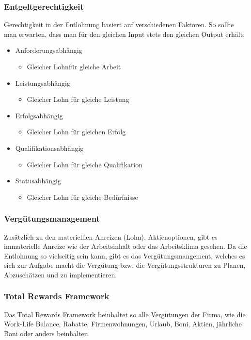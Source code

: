 \documentclass{article}
\begin{document}
	\subsubsection{Entgeltgerechtigkeit}
	Gerechtigkeit in der Entlohnung basiert auf verschiedenen Faktoren. So sollte man erwarten, dass man für den gleichen Input stets den gleichen Output erhält:
	\begin{itemize}
		\item{Anforderungsabhängig}
		\begin{itemize}
			\item{Gleicher Lohnfür gleiche Arbeit}
		\end{itemize}
		\item{Leistungsabhängig}
		\begin{itemize}
			\item{Gleicher Lohn für gleiche Leistung}
		\end{itemize}
		\item{Erfolgsabhängig}
		\begin{itemize}
			\item{Gleicher Lohn für gleichen Erfolg}
		\end{itemize}
		\item{Qualifikationsabhängig}
		\begin{itemize}
			\item{Gleicher Lohn für gleiche Qualifikation}
		\end{itemize}
		\item{Statusabhängig}
		\begin{itemize}
			\item{Gleicher Lohn für gleiche Bedürfnisse}
		\end{itemize}
	\end{itemize}
	\subsubsection{Vergütungsmanagement}
	Zusätzlich zu den materiellien Anreizen (Lohn), Aktienoptionen, gibt es immaterielle Anreize wie der Arbeitsinhalt oder das Arbeitsklima gesehen. Da die Entlohnung so vielseitig sein kann, gibt es das Vergütungsmangement, welches es sich zur Aufgabe macht die Vergütung bzw. die Vergütungsstrukturen zu Planen, Abzuschätzen und zu implementieren.
	\subsubsection{Total Rewards Framework}
	Das Total Rewards Framework beinhaltet so alle Vergütungen der Firma, wie die Work-Life Balance, Rabatte, Firmenwohnungen, Urlaub, Boni, Aktien, jährliche Boni oder anders beinhalten.
\end{document}
